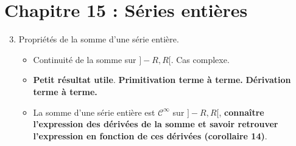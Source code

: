\documentclass[twoside,a4paper,french,10pt]{VcCours}
\begin{document}
\section*{Chapitre 15 : Séries entières}
\begin{enumerate}\setcounter{enumi}{2}
\item Propriétés de la somme d'une série entière.
\begin{itemize}
\item Continuité de la somme sur $]-R,R[$. Cas complexe.
\item \textbf{Petit résultat utile}. \textbf{Primitivation terme à terme.} 
\textbf{Dérivation terme à terme.}
\item La somme d'une série entière est $\mathcal{C}^{\infty}$ sur $]-R,R[$, 
\textbf{connaître l'expression des dérivées de la somme et savoir retrouver 
l'expression en fonction de ces dérivées (corollaire 14)}.

\end{itemize}
\end{enumerate}
\end{document}
